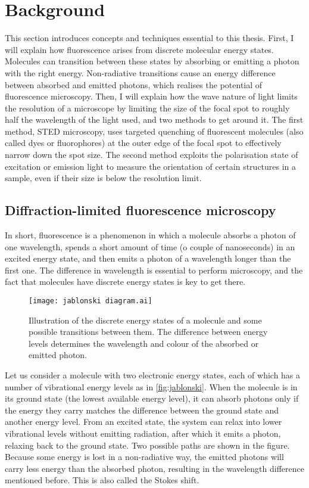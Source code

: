 \chapter{Background}

This section introduces concepts and techniques essential to this thesis. First, I will explain how fluorescence arises from discrete molecular energy states. Molecules can transition between these states by absorbing or emitting a photon with the right energy. Non-radiative transitions cause an energy difference between absorbed and emitted photons, which realises the potential of fluorescence microscopy. Then, I will explain how the wave nature of light limits the resolution of a microscope by limiting the size of the focal spot to roughly half the wavelength of the light used, and two methods to get around it. The first method, STED microscopy, uses targeted quenching of fluorescent molecules (also called dyes or fluorophores) at the outer edge of the focal spot to effectively narrow down the spot size. The second method exploits the polarisation state of excitation or emission light to measure the orientation of certain structures in a sample, even if their size is below the resolution limit.

\section{Diffraction-limited fluorescence microscopy}

In short, fluorescence is a phenomenon in which a molecule absorbs a photon of one wavelength, spends a short amount of time (o couple of nanoseconds) in an excited energy state, and then emits a photon of a wavelength longer than the first one. The difference in wavelength is essential to perform microscopy, and the fact that molecules have discrete energy states is key to get there.

\begin{figure}
	\centering
	\texttt{[image: jablonski diagram.ai]}
	\caption{
		Illustration of the discrete energy states of a molecule and some possible transitions between them. The difference between energy levels determines the wavelength and colour of the absorbed or emitted photon.
	}
	\label{fig:jablonski}
\end{figure}

Let us consider a molecule with two electronic energy states, each of which has a number of vibrational energy levels as in \autoref{fig:jablonski}. When the molecule is in its ground state (the lowest available energy level), it can absorb photons only if the energy they carry matches the difference between the ground state and another energy level. From an excited state, the system can relax into lower vibrational levels without emitting radiation, after which it emits a photon, relaxing back to the ground state. Two possible paths are shown in the figure. Because some energy is lost in a non-radiative way, the emitted photons will carry less energy than the absorbed photon, resulting in the wavelength difference mentioned before. This is also called the Stokes shift. 

